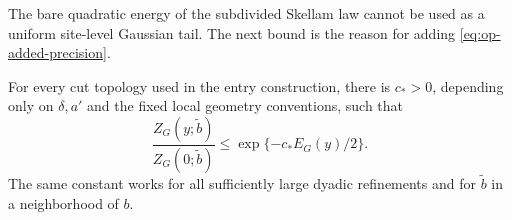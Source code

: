 The bare quadratic energy of the subdivided Skellam law cannot
be used as a uniform site-level Gaussian tail.  The next bound
is the reason for adding \eqref{eq:op-added-precision}.

\begin{lemma}\label{lem:op-large-field}
For every cut topology used in the entry construction, there is
\(c_*>0\), depending only on \(\delta,a'\) and the fixed local
geometry conventions, such that
\begin{equation}\label{eq:op-large-field}
 \frac{Z_G(y;\widetilde b)}{Z_G(0;\widetilde b)}
                  \leq \exp\{-c_*E_G(y)/2\}.
\end{equation}
The same constant works for all sufficiently large dyadic
refinements and for \(\widetilde b\) in a neighborhood of \(b\).
\end{lemma}

